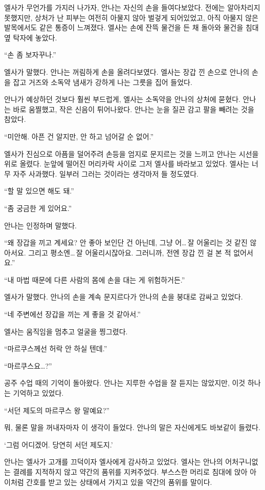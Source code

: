 엘사가 무언가를 가지러 나가자, 안나는 자신의 손을 들여다보았다. 전에는 알아차리지 못했지만, 상처가 난 피부는 여전히 아물지 않아 벌겋게 되어있었고, 아직 아물지 않은 발목에서도 같은 통증이 느껴졌다. 엘사는 손에 잔뜩 물건을 든 채 돌아와 물건을 침대 옆 탁자에 놓았다.

``손 좀 보자꾸나.''

엘사가 말했다. 안나는 꺼림하게 손을 올려다보였다. 엘사는 장갑 낀 손으로 안나의 손을 잡고 거즈와 소독약 냄새가 강하게 나는 그릇을 집어 들었다.

안나가 예상하던 것보다 훨씬 부드럽게, 엘사는 소독약을 안나의 상처에 묻혔다. 안나는 바로 움찔했고, 작은 신음이 튀어나왔다. 안나는 눈을 질끈 감고 팔을 빼려는 것을 참았다.

``미안해. 아픈 건 알지만, 안 하고 넘어갈 순 없어.''

엘사가 진심으로 아픔을 덜어주려 손등을 엄지로 문지르는 것을 느끼고 안나는 시선을 위로 올렸다. 눈앞에 떨어진 머리카락 사이로 그저 엘사를 바라보고 있었다. 엘사는 너무 자주 사과했다. 일부러 그러는 것이라는 생각마저 들 정도였다.

``할 말 있으면 해도 돼.''

``좀 궁금한 게 있어요.''

안나는 인정하며 말했다.

``왜 장갑을 끼고 계세요? 안 좋아 보인단 건 아닌데, 그냥 어\ldots\,잘 어울리는 것 같진 않아서요. 그리고 평소엔\ldots\,잘 어울리시잖아요. 그러니까, 전엔 장갑 낀 걸 본 적 없어서요.''

``내 마법 때문에 다른 사람의 몸에 손을 대는 게 위험하거든.''

엘사가 말했다. 안나의 손을 계속 문지르다가 안나의 손을 붕대로 감싸고 있었다.

``네 주변에선 장갑을 끼는 게 좋을 것 같아서.''

엘사는 움직임을 멈추고 얼굴을 찡그렸다.

``마르쿠스께선 허락 안 하실 텐데.''

``마르쿠스요\ldots?''

공주 수업 때의 기억이 돌아왔다. 안나는 지루한 수업을 잘 듣지는 않았지만, 이것 하나는 기억하고 있었다.

``서던 제도의 마르쿠스 왕 말예요?''

뭐, 물론 말을 꺼내자마자 이 생각이 들었다. 안나의 말은 자신에게도 바보같이 들렸다.

`그럼 어디겠어. 당연히 서던 제도지.'

안나는 엘사가 고개를 끄덕이자 엘사에게 감사하고 있었다. 엘사는 안나의 어처구니없는 결례를 지적하지 않고 약간의 품위를 지켜주었다. 부스스한 머리로 침대에 앉아 아이처럼 간호를 받고 있는 상태에서 가지고 있을 약간의 품위를 말이다.

